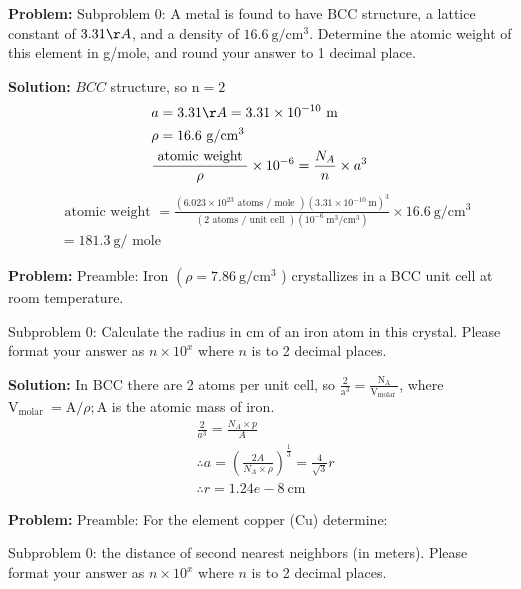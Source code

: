 \documentclass[10pt]{article}
\begin{document}
\textbf{Problem:}
Subproblem 0: A metal is found to have BCC structure, a lattice constant of $3.31 \AA$, and a density of $16.6 \mathrm{~g} / \mathrm{cm}^{3}$. Determine the atomic weight of this element in g/mole, and round your answer to 1 decimal place.


\textbf{Solution:}
$B C C$ structure, so $\mathrm{n}=2$
\[
\begin{aligned}
&a=3.31 \AA=3.31 \times 10^{-10} \mathrm{~m} \\
&\rho=16.6 \mathrm{~g} / \mathrm{cm}^{3} \\
&\frac{\text { atomic weight }}{\rho} \times 10^{-6}=\frac{N_{A}}{n} \times a^{3}
\end{aligned}
\]
\[
\begin{aligned}
&\text { atomic weight }=\frac{\left(6.023 \times 10^{23} \text { atoms } / \text { mole }\right)\left(3.31 \times 10^{-10} \mathrm{~m}\right)^{3}}{(2 \text { atoms } / \text { unit cell })\left(10^{-6} \mathrm{~m}^{3} / \mathrm{cm}^{3}\right)} \times 16.6 \mathrm{~g} / \mathrm{cm}^{3} \\
&= \boxed{181.3} \mathrm{~g} / \text { mole }
\end{aligned}
\]


\textbf{Problem:}
Preamble: Iron $\left(\rho=7.86 \mathrm{~g} / \mathrm{cm}^{3}\right.$ ) crystallizes in a BCC unit cell at room temperature.

Subproblem 0: Calculate the radius in cm of an iron atom in this crystal. Please format your answer as $n \times 10^x$ where $n$ is to 2 decimal places.


\textbf{Solution:}
In $\mathrm{BCC}$ there are 2 atoms per unit cell, so $\frac{2}{\mathrm{a}^{3}}=\frac{\mathrm{N}_{\mathrm{A}}}{\mathrm{V}_{\text {molar }}}$, where $\mathrm{V}_{\text {molar }}=\mathrm{A} / \rho ; \mathrm{A}$ is the atomic mass of iron.
\[
\begin{aligned}
&\frac{2}{a^{3}}=\frac{N_{A} \times p}{A} \\
&\therefore a=\left(\frac{2 A}{N_{A} \times \rho}\right)^{\frac{1}{3}}=\frac{4}{\sqrt{3}} r \\
&\therefore r= \boxed{1.24e-8} \mathrm{~cm}
\end{aligned}
\]


\textbf{Problem:}
Preamble: For the element copper (Cu) determine:

Subproblem 0: the distance of second nearest neighbors (in meters). Please format your answer as $n \times 10^x$ where $n$ is to 2 decimal places.
\end{document}

